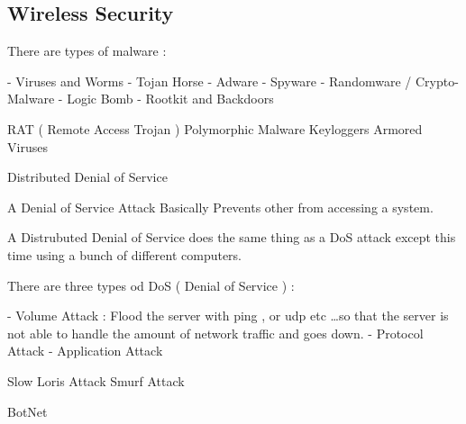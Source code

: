 



\subsection{Wireless Security}
\label{ssec:wireless_security}


\subsectionend






There are types of malware :

- Viruses and Worms
- Tojan Horse
- Adware
- Spyware
- Randomware / Crypto-Malware
- Logic Bomb
- Rootkit and Backdoors


RAT ( Remote Access Trojan )
Polymorphic Malware
Keyloggers
Armored Viruses










Distributed Denial of Service

A Denial of Service Attack Basically Prevents other from accessing a system.

A Distrubuted Denial of Service does the same thing as a DoS attack except this
time using a bunch of different computers.

There are three types od DoS ( Denial of Service ) :

- Volume Attack : Flood the server with ping , or udp etc \ldots so that the
server is not able to handle the amount of network traffic and goes down.
- Protocol Attack
- Application Attack


Slow Loris Attack
Smurf Attack

BotNet







\sectionend
